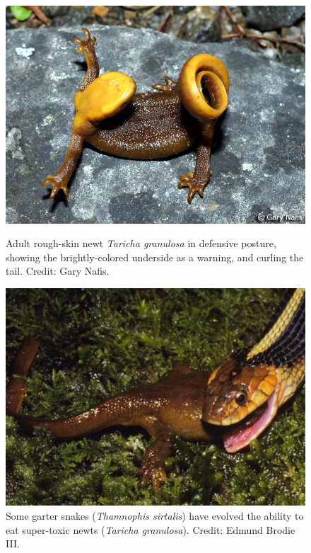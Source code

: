 \begin{figure}
  \begin{minipage}[b]{0.48\textwidth}
    \centering
    \vspace{-\intextsep}\hspace*{-.75\columnsep}
    \includegraphics[width=\textwidth]{figs/taricha.png}
    \caption{Adult rough-skin newt \textit{Taricha granulosa} in defensive posture, showing the brightly-colored underside as a warning, and curling the tail. Credit: Gary Nafis.}
    \label{fig:newt}
  \end{minipage}
  \hfill
  \begin{minipage}[b]{0.48\textwidth}
    \centering
    \vspace{-\intextsep}\hspace*{-.75\columnsep}
    \includegraphics[width=\textwidth]{figs/thamnophis.png}
    \caption{Some garter snakes (\textit{Thamnophis sirtalis}) have evolved the ability to eat super-toxic newts (\textit{Taricha granulosa}). Credit: Edmund Brodie III.}
    \label{fig:race}
  \end{minipage}
\end{figure}

